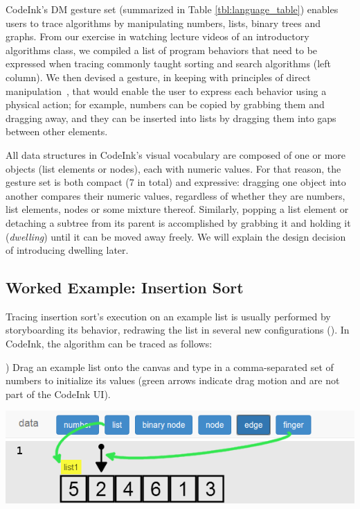 CodeInk's DM gesture set (summarized in Table \ref{tbl:language_table}) enables
users to trace algorithms by manipulating numbers, lists, binary trees and
graphs. From our exercise in watching lecture videos of an introductory
algorithms class, we compiled a list of program behaviors that need to be
expressed when tracing commonly taught sorting and search algorithms (left
column). We then devised a gesture, in keeping with principles of direct
manipulation~\cite{Shneiderman1982, Lee2012}, that would enable the user to
express each behavior using a physical action; for example, numbers can be
copied by grabbing them and dragging away, and they can be inserted into lists
by dragging them into gaps between other elements.

All data structures in CodeInk's visual vocabulary are composed of one or more
objects (list elements or nodes), each with numeric values. For that reason, the
gesture set is both compact (7 in total) and expressive: dragging one object
into another compares their numeric values, regardless of whether they are
numbers, list elements, nodes or some mixture thereof. Similarly, popping a list
element or detaching a subtree from its parent is accomplished by grabbing it
and holding it (\emph{dwelling}) until it can be moved away freely. We will
explain the design decision of introducing dwelling later.


\subsection{Worked Example: Insertion Sort}
Tracing insertion sort's execution on an example list is usually performed by
storyboarding its behavior, redrawing the list in several new configurations
(). In CodeInk, the algorithm can be traced as follows:

) Drag an example list onto the canvas and type in a comma-separated
set of numbers to initialize its values (green arrows indicate drag motion and
are not part of the CodeInk UI).

\vspace{-0.25em}
\noindent \includegraphics[width=0.7\columnwidth]{img/examples/insertion-1.png}
\vspace{0.5em}

